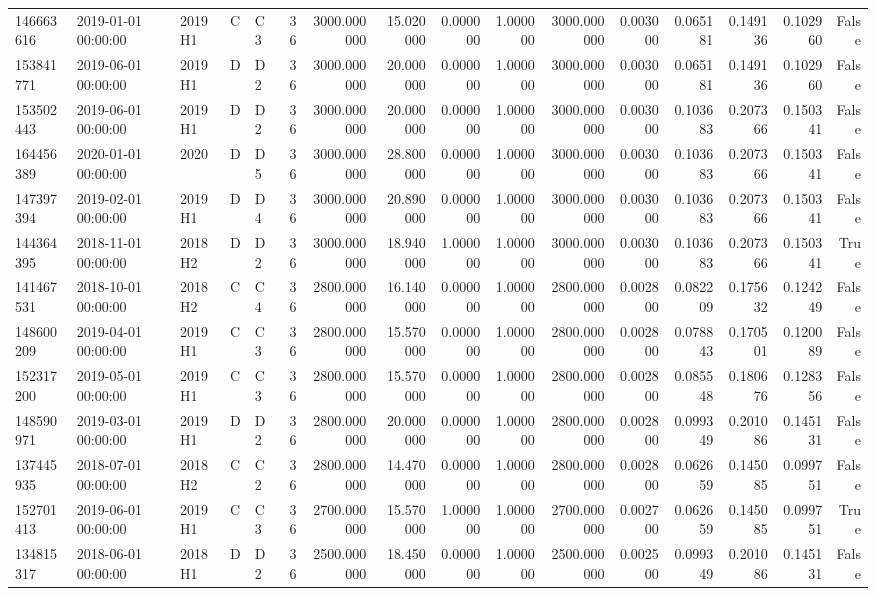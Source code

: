 \begin{tabular}{lllllrrrrrrrrrrr}
146663616 & 2019-01-01 00:00:00 & 2019H1 & C & C3 & 36 & 3000.000000 & 15.020000 & 0.000000 & 1.000000 & 3000.000000 & 0.003000 & 0.065181 & 0.149136 & 0.102960 & False \\
153841771 & 2019-06-01 00:00:00 & 2019H1 & D & D2 & 36 & 3000.000000 & 20.000000 & 0.000000 & 1.000000 & 3000.000000 & 0.003000 & 0.065181 & 0.149136 & 0.102960 & False \\
153502443 & 2019-06-01 00:00:00 & 2019H1 & D & D2 & 36 & 3000.000000 & 20.000000 & 0.000000 & 1.000000 & 3000.000000 & 0.003000 & 0.103683 & 0.207366 & 0.150341 & False \\
164456389 & 2020-01-01 00:00:00 & 2020 & D & D5 & 36 & 3000.000000 & 28.800000 & 0.000000 & 1.000000 & 3000.000000 & 0.003000 & 0.103683 & 0.207366 & 0.150341 & False \\
147397394 & 2019-02-01 00:00:00 & 2019H1 & D & D4 & 36 & 3000.000000 & 20.890000 & 0.000000 & 1.000000 & 3000.000000 & 0.003000 & 0.103683 & 0.207366 & 0.150341 & False \\
144364395 & 2018-11-01 00:00:00 & 2018H2 & D & D2 & 36 & 3000.000000 & 18.940000 & 1.000000 & 1.000000 & 3000.000000 & 0.003000 & 0.103683 & 0.207366 & 0.150341 & True \\
141467531 & 2018-10-01 00:00:00 & 2018H2 & C & C4 & 36 & 2800.000000 & 16.140000 & 0.000000 & 1.000000 & 2800.000000 & 0.002800 & 0.082209 & 0.175632 & 0.124249 & False \\
148600209 & 2019-04-01 00:00:00 & 2019H1 & C & C3 & 36 & 2800.000000 & 15.570000 & 0.000000 & 1.000000 & 2800.000000 & 0.002800 & 0.078843 & 0.170501 & 0.120089 & False \\
152317200 & 2019-05-01 00:00:00 & 2019H1 & C & C3 & 36 & 2800.000000 & 15.570000 & 0.000000 & 1.000000 & 2800.000000 & 0.002800 & 0.085548 & 0.180676 & 0.128356 & False \\
148590971 & 2019-03-01 00:00:00 & 2019H1 & D & D2 & 36 & 2800.000000 & 20.000000 & 0.000000 & 1.000000 & 2800.000000 & 0.002800 & 0.099349 & 0.201086 & 0.145131 & False \\
137445935 & 2018-07-01 00:00:00 & 2018H2 & C & C2 & 36 & 2800.000000 & 14.470000 & 0.000000 & 1.000000 & 2800.000000 & 0.002800 & 0.062659 & 0.145085 & 0.099751 & False \\
152701413 & 2019-06-01 00:00:00 & 2019H1 & C & C3 & 36 & 2700.000000 & 15.570000 & 1.000000 & 1.000000 & 2700.000000 & 0.002700 & 0.062659 & 0.145085 & 0.099751 & True \\
134815317 & 2018-06-01 00:00:00 & 2018H1 & D & D2 & 36 & 2500.000000 & 18.450000 & 0.000000 & 1.000000 & 2500.000000 & 0.002500 & 0.099349 & 0.201086 & 0.145131 & False \\

\end{tabular}
